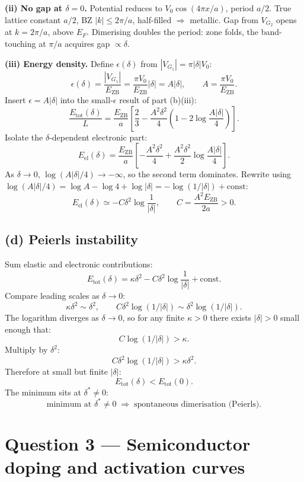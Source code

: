 \documentclass[11pt]{article}
\begin{document}
\textbf{(ii) No gap at $\delta=0$.} Potential reduces to $V_0\cos(4\pi x/a)$, period $a/2$. True lattice constant $a/2$, BZ $|k|\le 2\pi/a$, half-filled $\Rightarrow$ metallic. Gap from $V_{G_2}$ opens at $k=2\pi/a$, above $E_F$. Dimerising doubles the period: zone folds, the band-touching at $\pi/a$ acquires gap $\propto\delta$.

\textbf{(iii) Energy density.} Define $\epsilon(\delta)$ from $|V_{G_1}|=\pi|\delta|V_0$:
\[ \epsilon(\delta)=\frac{|V_{G_1}|}{E_{\text{ZB}}}=\frac{\pi V_0}{E_{\text{ZB}}}|\delta|=A|\delta|,\qquad A=\frac{\pi V_0}{E_{\text{ZB}}}. \]
Insert $\epsilon=A|\delta|$ into the small-$\epsilon$ result of part (b)(iii):
\begin{equation}
\boxed{\;\frac{E_{\text{tot}}(\delta)}{L}=\frac{E_{\text{ZB}}}{a}\!\left[\frac{2}{3}-\frac{A^2\delta^2}{4}\!\left(1-2\log\!\frac{A|\delta|}{4}\right)\right].\;}
\label{eq:Etot-delta}
\end{equation}
Isolate the $\delta$-dependent electronic part:
\[ E_{\text{el}}(\delta)=\frac{E_{\text{ZB}}}{a}\!\left[-\frac{A^2\delta^2}{4}+\frac{A^2\delta^2}{2}\log\!\frac{A|\delta|}{4}\right]. \]
As $\delta\to 0$, $\log(A|\delta|/4)\to-\infty$, so the second term dominates. Rewrite using $\log(A|\delta|/4)=\log A-\log 4+\log|\delta|=-\log(1/|\delta|)+\text{const}$:
\[ E_{\text{el}}(\delta)\simeq -C\delta^2\log\!\frac{1}{|\delta|},\qquad C=\frac{A^2 E_{\text{ZB}}}{2a}>0. \]

\subsection*{(d) Peierls instability}

Sum elastic and electronic contributions:
\[ E_{\text{tot}}(\delta)=\kappa\delta^2-C\delta^2\log\!\frac{1}{|\delta|}+\text{const}. \]
Compare leading scales as $\delta\to 0$:
\[ \kappa\delta^2\sim \delta^2,\qquad C\delta^2\log(1/|\delta|)\sim\delta^2\log(1/|\delta|). \]
The logarithm diverges as $\delta\to 0$, so for any finite $\kappa>0$ there exists $|\delta|>0$ small enough that:
\[ C\log(1/|\delta|)>\kappa. \]
Multiply by $\delta^2$:
\[ C\delta^2\log(1/|\delta|)>\kappa\delta^2. \]
Therefore at small but finite $|\delta|$:
\[ E_{\text{tot}}(\delta)<E_{\text{tot}}(0). \]
The minimum sits at $\delta^\ast\neq 0$:
\[ \boxed{\;\text{minimum at }\delta^\ast\neq 0\;\Rightarrow\;\text{spontaneous dimerisation (Peierls).}\;} \]

\section*{Question 3 --- Semiconductor doping and activation curves}
\end{document}
